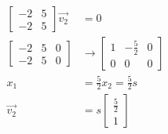 \documentclass{math}
\begin{document}
\begin{enumerate}[(a)]
\begin{align*}
    \begin{bmatrix}
      -2 & 5 \\
      -2 & 5
    \end{bmatrix}\vec{v_2} &= 0 \\
    \begin{bmatrix}
      -2 & 5 & 0 \\
      -2 & 5 & 0
    \end{bmatrix} &\to \begin{bmatrix}
      1 & -\frac{5}{2} & 0 \\
      0 & 0 & 0
    \end{bmatrix} \\
    x_1 &= \frac{5}{2}x_2 = \frac{5}{2}s \\
    \vec{v_2} &= s\begin{bmatrix}\frac{5}{2} \\ 1\end{bmatrix}
  \end{align*}
\end{enumerate}
\end{document}
